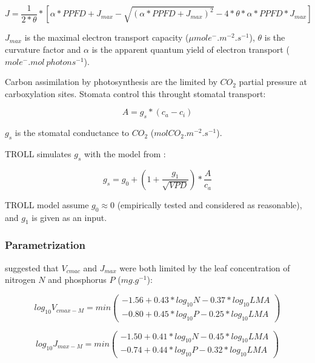 \documentclass[12pt,]{article}
\theoremstyle{definition}
\theoremstyle{definition}
\theoremstyle{definition}
\theoremstyle{remark}
\begin{document}
\begin{equation}
  J = \frac{1}{2*\theta}*[\alpha*PPFD+J_{max}-\sqrt{(\alpha*PPFD+J_{max})^2}-4*\theta*\alpha*PPFD*J_{max}]
  \label{eq:J}
\end{equation}

\(J_{max}\) is the maximal electron transport capacity
(\(\mu mol e^-.m^{-2}.s^{-1}\)), \(\theta\) is the curvature factor and
\(\alpha\) is the apparent quantum yield of electron transport
(\(mole^-.mol~photons^{-1}\)).

Carbon assimilation by photosynthesis are the limited by \(CO_2\)
partial pressure at carboxylation sites. Stomata control this throught
stomatal transport:

\begin{equation}
  A = g_s*(c_a-c_i)
  \label{eq:Ag}
\end{equation}

\(g_s\) is the stomatal conductance to \(CO_2\)
(\(molCO_2.m^{-2}.s^{-1}\)).

TROLL simulates \(g_s\) with the model from \citep{MEDLYN2011}:

\begin{equation}
  g_s = g_0 + (1 + \frac{g_1}{\sqrt{VPD}})*\frac{A}{c_a}
  \label{eq:gs}
\end{equation}

TROLL model assume \(g_0 \approx 0\) (empirically tested and considered
as reasonable), and \(g_1\) is given as an input.

\subsubsection{Parametrization}\label{parametrization}

\citet{DOMINGUES2010} suggested that \(V_{cmac}\) and \(J_{max}\) were
both limited by the leaf concentration of nitrogen \(N\) and phosphorus
\(P\) (\(mg.g^{-1}\)):

\begin{equation}
  log_{10} V_{cmax-M} = min( 
  \begin{array}{c} 
    -1.56+0.43*log_{10} N-0.37*log_{10} LMA \\
    -0.80+0.45*log_{10} P-0.25*log_{10} LMA 
  \end{array} 
  )
  \label{eq:VcmaxM}
\end{equation}

\begin{equation}
  log_{10} J_{max-M} = min(
  \begin{array}{c} 
    -1.50+0.41*log_{10} N-0.45*log_{10} LMA \\
    -0.74+0.44*log_{10} P-0.32*log_{10} LMA 
  \end{array}
  )
  \label{eq:JmaxM}
\end{equation}
\end{document}
